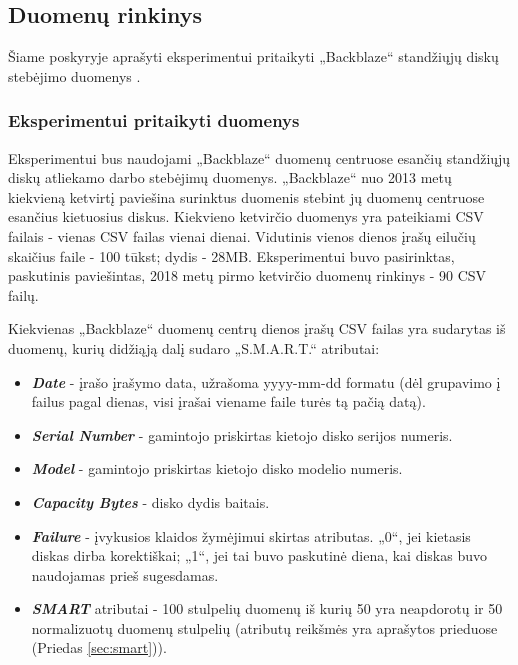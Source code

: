 \documentclass{VUMIFPSkursinis}
\begin{document}
\subsection{Duomenų rinkinys}
Šiame poskyryje aprašyti eksperimentui pritaikyti „Backblaze“ standžiųjų diskų stebėjimo duomenys \cite{backblaze}.

\subsubsection{Eksperimentui pritaikyti duomenys}
Eksperimentui bus naudojami „Backblaze“ duomenų centruose esančių standžiųjų diskų atliekamo darbo stebėjimų duomenys. „Backblaze“ nuo 2013 metų kiekvieną ketvirtį paviešina surinktus duomenis stebint jų duomenų centruose esančius kietuosius diskus. Kiekvieno ketvirčio duomenys yra pateikiami CSV failais - vienas CSV failas vienai dienai. Vidutinis vienos dienos įrašų eilučių skaičius faile - 100 tūkst; dydis - 28MB. Eksperimentui buvo pasirinktas, paskutinis paviešintas, 2018 metų pirmo ketvirčio duomenų rinkinys \cite{backblaze} - 90 CSV failų.

Kiekvienas „Backblaze“ duomenų centrų dienos įrašų CSV failas yra sudarytas iš duomenų, kurių didžiąją dalį sudaro „S.M.A.R.T.“ \cite{smart_meaning} atributai:

\begin{itemize}
\item \textit{\textbf{Date}} - įrašo įrašymo data, užrašoma yyyy-mm-dd formatu (dėl grupavimo į failus pagal dienas, visi įrašai viename faile turės tą pačią datą).
\item \textit{\textbf{Serial Number}} - gamintojo priskirtas kietojo disko serijos numeris.
\item \textit{\textbf{Model}} - gamintojo priskirtas kietojo disko modelio numeris.
\item \textit{\textbf{Capacity Bytes}} - disko dydis baitais.
\item \textit{\textbf{Failure}} - įvykusios klaidos žymėjimui skirtas atributas. „0“, jei kietasis diskas dirba korektiškai; „1“, jei tai buvo paskutinė diena, kai diskas buvo naudojamas prieš sugesdamas.
\item \textit{\textbf{SMART}} atributai - 100 stulpelių duomenų iš kurių 50 yra neapdorotų ir 50 normalizuotų duomenų stulpelių (atributų reikšmės yra aprašytos prieduose (Priedas \ref{sec:smart})).
\end{itemize}
\end{document}
